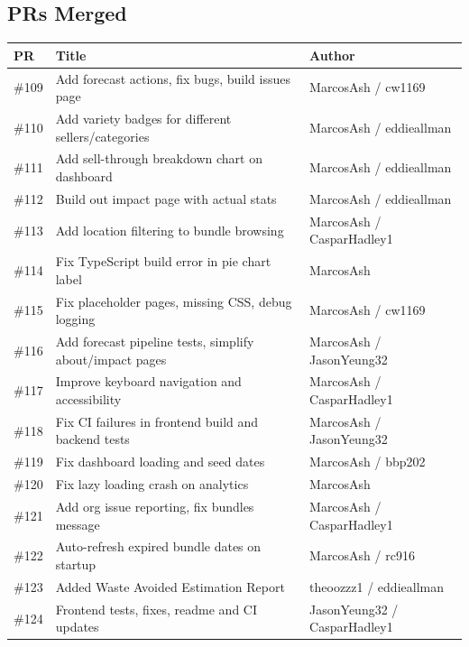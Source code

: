 \documentclass[a4paper,11pt]{article}
\begin{document}
\subsection*{PRs Merged}

\begin{tabular}{l l l}
\toprule
PR & Title & Author \\
\midrule
\#109 & Add forecast actions, fix bugs, build issues page & MarcosAsh / cw1169 \\
\#110 & Add variety badges for different sellers/categories & MarcosAsh / eddieallman \\
\#111 & Add sell-through breakdown chart on dashboard & MarcosAsh / eddieallman \\
\#112 & Build out impact page with actual stats & MarcosAsh / eddieallman \\
\#113 & Add location filtering to bundle browsing & MarcosAsh / CasparHadley1 \\
\#114 & Fix TypeScript build error in pie chart label & MarcosAsh \\
\#115 & Fix placeholder pages, missing CSS, debug logging & MarcosAsh / cw1169 \\
\#116 & Add forecast pipeline tests, simplify about/impact pages & MarcosAsh / JasonYeung32 \\
\#117 & Improve keyboard navigation and accessibility & MarcosAsh / CasparHadley1 \\
\#118 & Fix CI failures in frontend build and backend tests & MarcosAsh / JasonYeung32 \\
\#119 & Fix dashboard loading and seed dates & MarcosAsh / bbp202 \\
\#120 & Fix lazy loading crash on analytics & MarcosAsh \\
\#121 & Add org issue reporting, fix bundles message & MarcosAsh / CasparHadley1 \\
\#122 & Auto-refresh expired bundle dates on startup & MarcosAsh / rc916 \\
\#123 & Added Waste Avoided Estimation Report & theoozzz1 / eddieallman \\
\#124 & Frontend tests, fixes, readme and CI updates & JasonYeung32 / CasparHadley1 \\
\bottomrule
\end{tabular}
\end{document}
